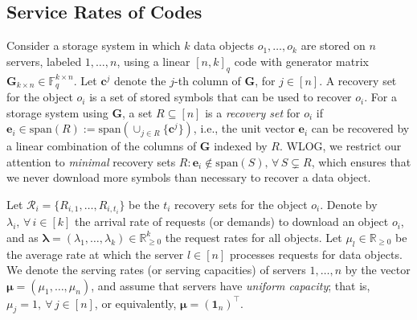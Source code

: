 \documentclass[conference,letterpaper]{IEEEtran}
\begin{document}
\subsection{Service Rates of Codes}
Consider a storage system in which $k$ data objects $o_1, \hdots, o_k$ are stored on $n$ servers, labeled $1, \hdots, n$, using a linear $[n, k]_q$ code with generator matrix $\boldsymbol{G}_{k\times n} \in \mathbb{F}^{k\times n}_q$. Let $\boldsymbol{c}^j$ denote the $j$-th column of $\boldsymbol{G}$, for $j \in [n]$. A recovery set for the object $o_i$ is a set of stored symbols that can be used to recover $o_i$. For a storage system using $\boldsymbol{G}$, a set $R \subseteq [n]$ is a \textit{recovery set} for $o_i$ if $\boldsymbol{e}_i \in \text{span}(R) := \text{span}(\cup_{j \in R}\{\boldsymbol{c}^j\})$, i.e., the unit vector $\boldsymbol{e}_i$ can be recovered by a linear combination of the columns of $\boldsymbol{G}$ indexed by $R$. WLOG, we restrict our attention to \textit{minimal} recovery sets $R: \boldsymbol{e}_i \notin \text{span}(S),\, \forall\, S \subsetneq R$, which ensures that we never download more symbols than necessary to recover a data object.

Let $\mathcal{R}_i = \{R_{i, 1}, \hdots, R_{i, t_i}\}$ be the $t_i$ recovery sets for the object $o_i$. Denote by ${\lambda_i},\, \forall\, i \in [k]$ the arrival rate of requests (or demands) to download an object $o_i$, and as $\boldsymbol{\lambda} = (\lambda_1, \hdots, \lambda_k) \in \mathbb{R}_{\ge 0}^k$ the request rates for all objects. Let $\mu_{l} \in \mathbb{R}_{\ge 0}$ be the average rate at which the server $l\in [n]$ processes requests for data objects. We denote the serving rates (or serving capacities) of servers \( 1, \ldots, n \) by the vector \( \boldsymbol{\mu} = (\mu_1, \ldots, \mu_n) \), and assume that servers have \emph{uniform capacity}; that is, \( \mu_j = 1, \ \forall\, j \in [n] \), or equivalently, \( \boldsymbol{\mu} = (\boldsymbol{1}_n)^{\top} \).
\end{document}
